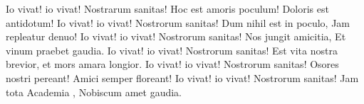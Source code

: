 \beginverse
Io vivat! io vivat!
Nostrarum sanitas!
Hoc est amoris poculum!
Doloris est antidotum!
\endverse
\beginverse
Io vivat! io vivat!
Nostrorum sanitas!
Dum nihil est in poculo,
Jam repleatur denuo!
\endverse
\beginverse
Io vivat! io vivat!
Nostrorum sanitas!
Nos jungit amicitia,
Et vinum praebet gaudia.
\endverse
\beginverse
Io vivat! io vivat!
Nostrorum sanitas!
Est vita nostra brevior,
et mors amara longior.
\endverse
\beginverse
Io vivat! io vivat!
Nostrorum sanitas!
Osores nostri pereant!
Amici semper floreant!
\endverse
\beginverse
Io vivat! io vivat!
Nostrorum sanitas!
Jam tota Academia ,
Nobiscum amet gaudia.
\endverse
\endsong